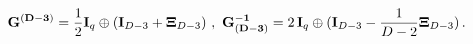 \begin{equation}
\label{modmetric3} {\bf G^{(D-3)}}=\frac{1}{2}{\bf I}_q \oplus( {\bf I}_{D-3} +
{\bf\Xi}_{D-3})~,~ {\bf G_{(D-3)}^{-1}}=2\, {\bf I}_q \oplus( {\bf I}_{D-3} - 
\frac{1}{D-2} {\bf\Xi}_{D-3}) \, .
\end{equation} 
